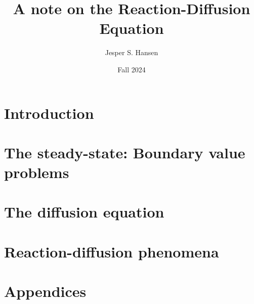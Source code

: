 \documentclass[10pt, b5paper]{book}
\title{A note on the Reaction-Diffusion Equation}
\author{Jesper S. Hansen}
\date{Fall 2024}
\begin{document}
\maketitle



\clearpage

\tableofcontents


\chapter{Introduction}



\chapter{The steady-state: Boundary value problems\label{sect:BV}}



\chapter{The diffusion equation}



\chapter{Reaction-diffusion phenomena\label{ch:rd}}




\chapter{Appendices}






\end{document}
